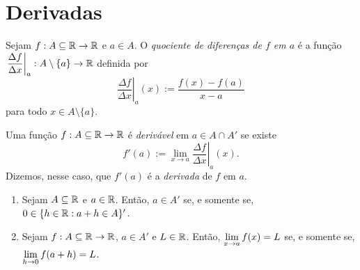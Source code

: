 \chapter{Derivadas}

\begin{definition}
    Sejam $f : A \subseteq \mathbb{R} \to \mathbb{R}$ e $a \in A$. O \emph{quociente de diferenças de $f$ em $a$} é a função $\left. \dfrac{\Delta f}{\Delta x} \right|_a : A \setminus \{ a\} \to \mathbb{R}$ definida por
        \[
            \left. \dfrac{\Delta f}{\Delta x} \right|_a (x) := \dfrac{f(x) - f(a)}{x-a}
        \]
    para todo $x \in A \setminus \{a\}$.
\end{definition}

\begin{definition} \label{defi.calc:derivada}
    Uma função $f : A \subseteq \mathbb{R} \to \mathbb{R}$ é \emph{derivável} em $a \in A \cap A'$ se existe
        \[
            f'(a) := \lim_{x \to a} \left. \dfrac{\Delta f}{\Delta x} \right|_a (x).
        \]
    Dizemos, nesse caso, que $f'(a)$ é a \emph{derivada} de $f$ em $a$.
\end{definition}

\begin{proposition} \label{prop.calc1:amaish}
    \leavevmode
        \begin{enumerate}[leftmargin=*, align=left, label=\textbf{(\alph*)}]
            \item Sejam $A \subseteq \mathbb{R}$ e $a \in \mathbb{R}$. Então, $a \in A'$ se, e somente se, $0 \in \{h \in \mathbb{R} : a+h \in A\}'$.
            \item Sejam $f : A \subseteq \mathbb{R} \to \mathbb{R}$, $a \in A'$ e $L \in \mathbb{R}$. Então, $\displaystyle \lim_{x \to a} f(x) = L$ se, e somente se, $\displaystyle \lim_{h \to 0} f(a+h) = L$.
        \end{enumerate}
\end{proposition}

